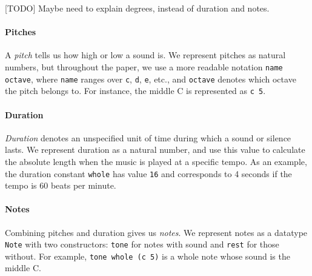 [TODO] Maybe need to explain degrees, instead of duration and notes.

\paragraph{Pitches}

A \emph{pitch} tells us how high or low a sound is.
We represent pitches as natural numbers, but throughout the paper,
we use a more readable notation \texttt{name octave}, where
\texttt{name} ranges over \texttt{c}, \texttt{d}, \texttt{e}, etc.,
and \texttt{octave} denotes which octave the pitch belongs to.
For instance, the middle C is represented as \texttt{c 5}.




\paragraph{Duration}

\emph{Duration} denotes an unspecified unit of time during which
a sound or silence lasts.
We represent duration as a natural number, and use this value to
calculate the absolute length when the music is played at a specific
tempo.
As an example, the duration constant \texttt{whole} has value
\texttt{16} and corresponds to 4 seconds if the tempo is 60 beats
per minute.


\paragraph{Notes}

Combining pitches and duration gives us \emph{notes}.
We represent notes as a datatype \texttt{Note} with two constructors:
\texttt{tone} for notes with sound and \texttt{rest} for those without.
For example, \texttt{tone whole (c 5)} is a whole note whose sound
is the middle C.


